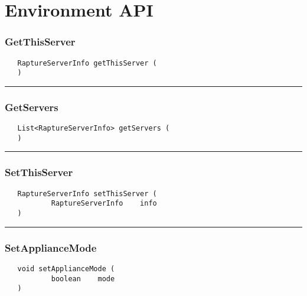 \chapter{Environment API}

\subsection{GetThisServer}
\label{Api:GetThisServer}
\begin{verbatim}
   RaptureServerInfo getThisServer (
   )
\end{verbatim}



\rule{15cm}{2pt}
\subsection{GetServers}
\label{Api:GetServers}
\begin{verbatim}
   List<RaptureServerInfo> getServers (
   )
\end{verbatim}



\rule{15cm}{2pt}
\subsection{SetThisServer}
\label{Api:SetThisServer}
\begin{verbatim}
   RaptureServerInfo setThisServer (
           RaptureServerInfo    info
   )
\end{verbatim}



\rule{15cm}{2pt}
\subsection{SetApplianceMode}
\label{Api:SetApplianceMode}
\begin{verbatim}
   void setApplianceMode (
           boolean    mode
   )
\end{verbatim}




